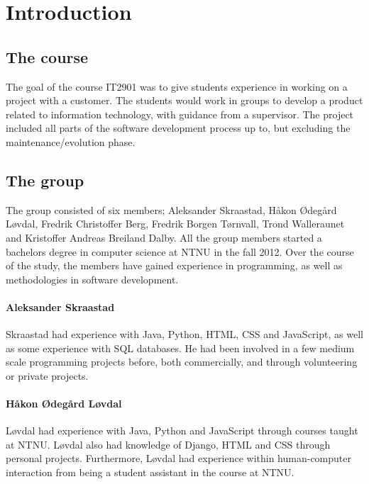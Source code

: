 
\chapter{Introduction}
\label{ch:introduction}

\section{The course}
\label{sec:introduction-the_course}

The goal of the course IT2901 was to give students experience in working on a project with a customer. The students would work in groups to develop a product related to information technology, with guidance from a supervisor. The project included all parts of the software development process up to, but excluding the maintenance/evolution phase.

\section{The group}
\label{sec:introduction-the_group}

The group consisted of six members; Aleksander Skraastad, Håkon Ødegård Løvdal, Fredrik Christoffer Berg, Fredrik Borgen Tørnvall, Trond Walleraunet and Kristoffer Andreas Breiland Dalby. All the group members started a bachelors degree in computer science at NTNU in the fall 2012. Over the course of the study, the members have gained experience in programming, as well as methodologies in software development.

\subsubsection{Aleksander Skraastad}
Skraastad had experience with Java, Python, HTML, CSS and JavaScript, as well as some experience with SQL databases. He had been involved in a few medium scale programming projects before, both commercially, and through volunteering or private projects.

\subsubsection{Håkon Ødegård Løvdal}

Løvdal had experience with Java, Python and JavaScript through courses taught at NTNU. Løvdal also had knowledge of Django, HTML and CSS through personal projects. Furthermore, Løvdal had experience within human-computer interaction from being a student assistant in the course at NTNU. 

